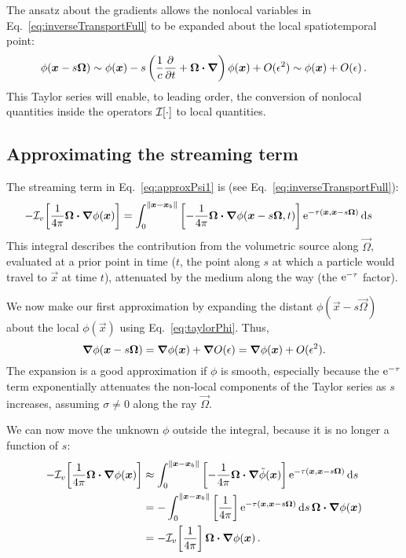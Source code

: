 The ansatz about the gradients allows the nonlocal variables in
Eq.~\eqref{eq:inverseTransportFull} to be expanded about
the local spatiotemporal point:
\begin{equation} \label{eq:taylorPhi}
  \phi(\bm{x} - s \bm{\Omega})
  \sim \phi(\bm{x}) - s \left( \frac{1}{c} \frac{\partial }{\partial t} + \bm{\Omega} \bm{\cdot}
  \bm{\nabla}  \right) \phi (\bm{x}) + O(\epsilon^2) \sim \phi(\bm{x}) +
  O(\epsilon) \,.
\end{equation}
This Taylor series will enable, to leading order, the conversion of nonlocal
quantities inside the operators $\mathcal{I}_{}\!\left[\cdot\right]$ to local quantities.

\subsection{Approximating the streaming term}
The streaming term in Eq.~\eqref{eq:approxPsi1} is (see
Eq.~\eqref{eq:inverseTransportFull}):
\begin{align*}
- \mathcal{I}_{v}\!\left[\frac{1}{4\pi} \bm{\Omega}\bm{\cdot} \bm{\nabla} \phi(\bm{x})\right]
  &= \int_{0}^{\left\| \bm{x} - \bm{x}_b \right\|}
    \left[ -\frac1{4\pi}\bm{\Omega}\bm{\cdot} \bm{\nabla} \phi(\bm{x} - s \bm{\Omega},
    t)
    \right]
    \mathop{}\!\mathrm{e}^{ -\tau(\bm{x}, \bm{x} - s \bm{\Omega})}
    \mathop{}\!\mathrm{d} s
\end{align*}
This integral describes the contribution from the volumetric source  along
$\vec{\Omega}$, evaluated at a prior
point in time ($t$, the point along $s$ at which a particle would travel
to $\vec{x}$ at time $t$), attenuated by the medium along the way (the
$\mathop{}\!\mathrm{e}^{ -\tau }$ factor).

We now make our first approximation by expanding the distant $\phi(\vec{x} - s
\vec{\Omega})$ about the local $\phi(\vec{x})$ using
Eq.~\eqref{eq:taylorPhi}. Thus,
\begin{equation*}
  \bm{\nabla} \phi(\bm{x} - s \bm{\Omega})
  = \bm{\nabla} \phi(\bm{x}) + \bm{\nabla} O(\epsilon)
  = \bm{\nabla} \phi(\bm{x}) + O(\epsilon^2).
\end{equation*}
The expansion is a good approximation if $\phi$ is smooth, especially because the
$\mathop{}\!\mathrm{e}^{ -\tau }$ term exponentially attenuates the non-local components of the
Taylor series as $s$ increases, assuming $\sigma\ne 0$ along the ray
$\vec{\Omega}$.

We can now move the unknown $\phi$ outside the integral,
because it is no longer a function of $s$:
\begin{align}\nonumber
- \mathcal{I}_{v}\!\left[\frac{1}{4\pi} \bm{\Omega}\bm{\cdot} \bm{\nabla} \phi(\bm{x})\right]
  &\approx \int_{0}^{\left\| \bm{x} - \bm{x}_b \right\|}
    \left[ -\frac1{4\pi}\bm{\Omega}\bm{\cdot} \bm{\nabla} \tilde\phi(\bm{x}) \right]
    \mathop{}\!\mathrm{e}^{ -\tau(\bm{x}, \bm{x} - s \bm{\Omega})}
    \mathop{}\!\mathrm{d} s
  \\\nonumber
  &= - \int_{0}^{\left\| \bm{x} - \bm{x}_b \right\|}
    \left[ \frac1{4\pi}\right]
    \mathop{}\!\mathrm{e}^{ -\tau(\bm{x}, \bm{x} - s \bm{\Omega})} \mathop{}\!\mathrm{d} s \,
    \bm{\Omega}\bm{\cdot} \bm{\nabla} \phi(\bm{x})
  \\\label{eq:streamingApprox}
  &= - \mathcal{I}_{v}\!\left[ \frac1{4\pi} \right] \bm{\Omega}\bm{\cdot} \bm{\nabla} \phi(\bm{x})
  \,.
\end{align}

